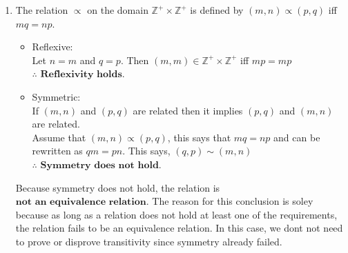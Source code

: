 \documentclass{article}
\newcommand{\Z}{\mathbb{Z}}
\begin{document}
\begin{enumerate}
\begin{enumerate}
    \item The relation $\varpropto$ on the domain $\Z^+\times\Z^+$ is defined by $(m,n) \varpropto (p,q)$ iff $mq = np$.
    \begin{itemize}
        \item Reflexive:\\Let $n = m$ and $q = p$. Then $(m,m) \in \Z^+\times\Z^+$ iff $mp = mp$\\$\therefore$ $\textbf{Reflexivity holds.}$\\
        \item Symmetric:\\If $(m,n)$ and $(p,q)$ are related then it implies $(p,q)$ and $(m,n)$ are related.\\Assume that $(m,n) \varpropto (p,q)$,
        this says that $mq = np$ and can be rewritten as $qm = pn$. This says, $(q,p) \sim (m,n)$\\$\therefore$ $\textbf{Symmetry does not hold.}$
    \end{itemize}

    Because symmetry does not hold, the relation is $\textbf{not an equivalence relation.}$ The reason for this conclusion is soley
    because as long as a relation does not hold at least one of the requirements, the relation fails to be an equivalence relation. In this case,
    we dont not need to prove or disprove transitivity since symmetry already failed.
\end{enumerate}

\end{enumerate}
\end{document}

